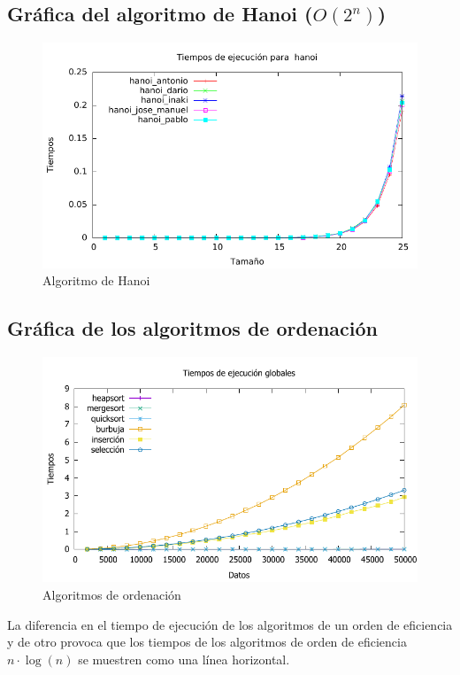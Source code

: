 \documentclass[a4paper, 11pt]{article}
\begin{document}
\subsection{Gráfica del algoritmo de Hanoi ($O(2^n)$)}
\begin{figure}[H] \includegraphics[width=16cm]{hanoi_todos_g} \centering
	\caption{Algoritmo de Hanoi} \end{figure}

\subsection{Gráfica de los algoritmos de ordenación}
\begin{figure}[h] \includegraphics[width=16cm]{comparativa_global_g} \centering
	\caption{Algoritmos de ordenación} \end{figure}

La diferencia en el tiempo de ejecución de los algoritmos de un orden de eficiencia y de otro provoca que los tiempos de los algoritmos de orden de eficiencia $n \cdot \log (n)$ se muestren como una línea horizontal.
\end{document}
